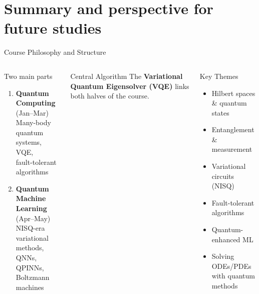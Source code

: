\documentclass[aspectratio=169,10pt]{beamer}
\begin{document}
\section{Summary and perspective for future studies}

\begin{frame}{Course Philosophy and Structure}
  \begin{columns}[T]
      \begin{block}{Two main parts}
        \begin{enumerate}
          \item \textbf{Quantum Computing} (Jan--Mar)\\
                Many-body quantum systems, VQE,\\
                fault-tolerant algorithms
          \item \textbf{Quantum Machine Learning} (Apr--May)\\
                NISQ-era variational methods,\\
                QNNs, QPINNs, Boltzmann machines
        \end{enumerate}
      \end{block}
      \vspace{4pt}
      \begin{alertblock}{Central Algorithm}
        The \textbf{Variational Quantum Eigensolver (VQE)}
        links both halves of the course.
      \end{alertblock}
      \begin{block}{Key Themes}
        \begin{itemize}
          \item Hilbert spaces \& quantum states
          \item Entanglement \& measurement
          \item Variational circuits (NISQ)
          \item Fault-tolerant algorithms
          \item Quantum-enhanced ML
          \item Solving ODEs/PDEs with quantum methods
        \end{itemize}
      \end{block}
  \end{columns}
\end{frame}
\end{document}
